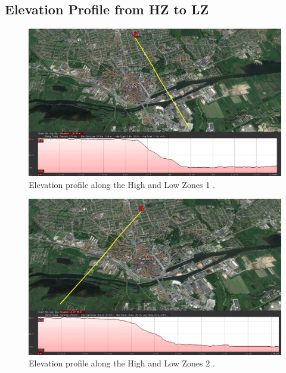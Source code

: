 
\begin{landscape}

\chapter{Elevation Profile from HZ to LZ}
\label{elevation_profile_of_randers}
\thispagestyle{empty}

\vspace{-6mm}

\begin{figure}[H]
\centering
\includegraphics[width=1.27\textwidth]{report/pictures/elev_profile}
\caption{Elevation profile along the High and Low Zones 1 \cite{map1}.}
\label{fig:elev_profile}
\end{figure}

\vfill
\raisebox{0pt}{\makebox[\linewidth]{\thepage}}


\newpage
\thispagestyle{empty}

\begin{figure}[H]
\centering
\includegraphics[width=1.27\textwidth]{report/pictures/elev_profile1}
\caption{Elevation profile along the High and Low Zones 2 \cite{map1}.}
\label{fig:elev_profile1}
\end{figure}
\thispagestyle{empty}

\vfill
\raisebox{0pt}{\makebox[\linewidth]{\thepage}}

\end{landscape}